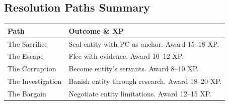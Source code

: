 \documentclass[11pt]{article}
\begin{document}
\subsection*{Resolution Paths Summary}

\begin{longtable}{|p{4cm}|p{8cm}|}
\hline
\rowcolor{tableheader}
\textbf{Path} & \textbf{Outcome \& XP} \\
\hline
The Sacrifice & Seal entity with PC as anchor. Award 15--18 XP. \\
The Escape & Flee with evidence. Award 10--12 XP. \\
The Corruption & Become entity's servants. Award 8--10 XP. \\
The Investigation & Banish entity through research. Award 18--20 XP. \\
The Bargain & Negotiate entity limitations. Award 12--15 XP. \\
\hline
\end{longtable}


\end{document}

